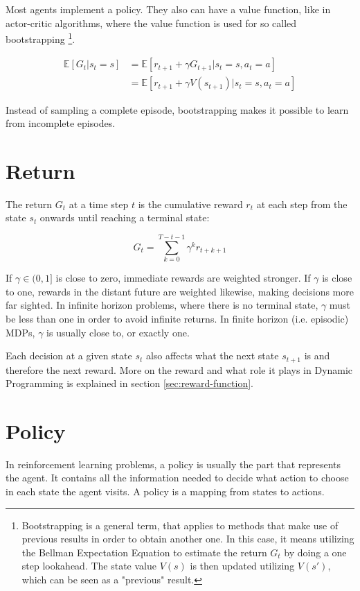 Most agents implement a policy. They also can have a value function, like in actor-critic algorithms, where the value function is used for so called bootstrapping \footnote{Bootstrapping is a general term, that applies to methods that make use of previous results in order to obtain another one. In this case, it means utilizing the Bellman Expectation Equation to estimate the return $G_t$ by doing a one step lookahead. The state value $V(s)$ is then updated utilizing $V(s')$, which can be seen as a "previous" result.}.

\begin{align}
\mathbb{E}[G_t|s_t=s] &= \mathbb{E}[r_{t+1} + \gamma G_{t+1}|s_t=s, a_t=a] \\
&=\mathbb{E}[r_{t+1}+ \gamma V(s_{t+1})|s_t=s, a_t=a]
\end{align}

Instead of sampling a complete episode, bootstrapping makes it possible to learn from incomplete episodes.

\section{Return}

The return $G_t$ at a time step $t$ is the cumulative reward $r_t$ at each step from the state $s_t$ onwards until reaching a terminal state:

\begin{equation}
G_t = \sum_{k=0}^{T-t-1}\gamma^k r_{t+k+1}
\end{equation}

If $\gamma \in (0,1]$ is close to zero, immediate rewards are weighted stronger. If $\gamma$ is close to one, rewards in the distant future are weighted likewise, making decisions more far sighted. In infinite horizon problems, where there is no terminal state, $\gamma$ must be less than one in order to avoid infinite returns. In finite horizon (i.e. episodic) MDPs, $\gamma$ is usually close to, or exactly one.

Each decision at a given state $s_t$ also affects what the next state $s_{t+1}$ is and therefore the next reward. More on the reward and what role it plays in Dynamic Programming is explained in section \ref{sec:reward-function}.

\section{Policy}
\label{sec:policy}
In reinforcement learning problems, a policy is usually the part that represents the agent. It contains all the information needed to decide what action to choose in each state the agent visits. A policy is a mapping from states to actions.

